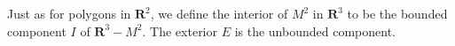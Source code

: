 Just as for polygons in $\mathbf{R}^2$, we define the interior of $M^2$ in $\mathbf{R}^3$ to be the bounded component $I$ of $\mathbf{R}^3 - M^2$. The exterior $E$ is the unbounded component.
